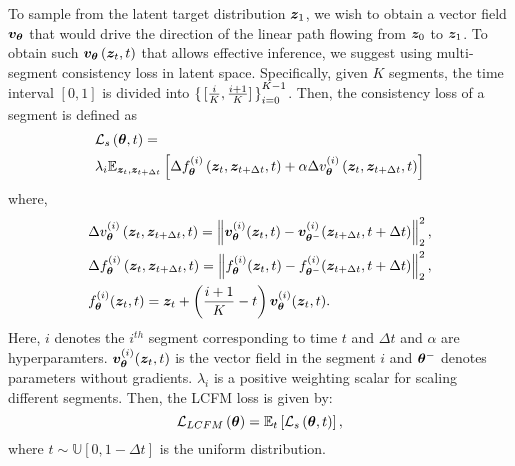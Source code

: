 To sample from the latent target distribution $\vectorsym{z}_1$, we wish to obtain a vector field $\vectorsym{v}_{\vectorsym{\theta}}$ that would drive the direction of the linear path flowing from $\z_0$ to $\z_1$. To obtain such $\vectorsym{v}_{\vectorsym{\theta}}\brackets{\vectorsym{z}_t,t}$ that allows effective inference, we suggest using multi-segment consistency loss \cite{yang2024consistencyfm} in latent space. Specifically, given $K$ segments, the time interval $[0,1]$ is divided into $\set{[\frac{i}{K},\frac{i+1}{K}]}_{i=0}^{K-1}$. Then, the consistency loss of a segment is defined as
\begin{align}\label{lcfm_loss}
&\mathcal{L}_{s}\brackets{\vectorsym{\theta},t}
=\\
&\lambda_{i}\expectation{\Delta f^{(i)}_{\vectorsym{\theta}}\brackets{\vectorsym{z}_t,\vectorsym{z}_{t+\Delta t},t}+\alpha\Delta v^{(i)}_{\vectorsym{\theta}}\brackets{\vectorsym{z}_t,\vectorsym{z}_{t+\Delta t},t} }{\vectorsym{z}_{t},\vectorsym{z}_{t+\Delta t}}\nonumber
\end{align}
where, 
\begin{align}
    &\Delta v_{\vectorsym{\theta}}^{(i)}\brackets{\vectorsym{z}_t,\vectorsym{z}_{t+\Delta t},t}=\norm{\vectorsym{v}^{(i)}_{\vectorsym{\theta}}(\vectorsym{z}_t,t)-\vectorsym{v}^{(i)}_{\vectorsym{\theta}^{-}}(\vectorsym{z}_{t+\Delta t},t+\Delta t)}_2^2,\nonumber\\
    &\Delta{f}^{(i)}_{\p}\brackets{\vectorsym{z}_t,\vectorsym{z}_{t+\Delta t},t}=\norm{f^{(i)}_{\vectorsym{\theta}}(\vectorsym{z}_t,t)-f^{(i)}_{\vectorsym{\theta}^{-}}(\vectorsym{z}_{t+\Delta t},t+\Delta t)}_2^2,\nonumber\\
    &f^{(i)}_{\vectorsym{\theta}}(\vectorsym{z}_t,t) = \vectorsym{z}_t + \brackets{\frac{i+1}{K}-t}\vectorsym{v}^{(i)}_{\vectorsym{\theta}}(\vectorsym{z}_{t},t).\nonumber
\end{align}
Here, $i$ denotes the $i^{th}$ segment corresponding to time $t$ and $\Delta t$ and $\alpha$ are hyperparamters. $\vectorsym{v}^{(i)}_{\vectorsym{\theta}}(\vectorsym{z}_{t},t)$ is the vector field in the segment $i$ and $\vectorsym{\theta}^{-}$ denotes parameters without gradients. $\lambda_i$ is a positive weighting scalar for scaling different segments. Then, the LCFM loss is given by:
\begin{equation}
\mathcal{L}_{LCFM}\brackets{\vectorsym{\theta}}=\expectation{\mathcal{L}_{s}\brackets{\vectorsym{\theta},t}}{t},
\end{equation}
where $t\sim\mathbb{U}[0,1-\Delta t]$ is the uniform distribution. 


